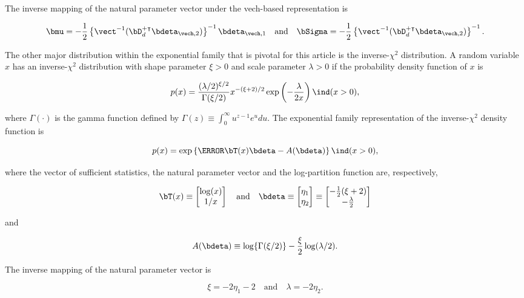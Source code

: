 \documentclass[12pt]{article}
\theoremstyle{plain}
\theoremstyle{definition}
\theoremstyle{remark}
\begin{document}
\noindent The inverse mapping of the natural parameter vector under the vech-based representation is

\begin{equation}
	\bmu = -\frac12 \left\{ \vect^{-1} (\bD_d^{+ \intercal}\bdeta_{\vech, 2}) \right\}^{-1} \bdeta_{\vech, 1} \quad
	\text{and} \quad
	\bSigma = -\frac12 \left\{ \vect^{-1} (\bD_d^{+ \intercal}\bdeta_{\vech, 2}) \right\}^{-1}.
\label{gauss_vech_comm_params}
\end{equation}

The other major distribution within the exponential family that is pivotal for this article is the inverse-$\chi^2$ distribution.
A random variable $x$ has an inverse-$\chi^2$ distribution with shape parameter $\xi > 0$ and scale parameter
$\lambda > 0$ if the probability density function of $x$ is

\[
	p(x) = 
		\frac{(\lambda/2)^{\xi/2}}{\Gamma (\xi/2)}
		x^{-(\xi + 2)/2} \exp \left( -\frac{\lambda}{2 x} \right) \ind (x > 0),
\]

\noindent where $\Gamma (\cdot)$ is the gamma function defined by $\Gamma (z) \equiv \int_0^\infty u^{z - 1} e^u
du$. The exponential family representation of the inverse-$\chi^2$ density function is

\[
	p(x) = \exp \left\{ \T{\bT (x)} \bdeta - A(\bdeta) \right\} \ind (x > 0),
\]

\noindent where the vector of sufficient statistics, the natural parameter vector and the log-partition function are,
respectively,

\[
	\bT (x) \equiv \begin{bmatrix}
		\log (x) \\
		1/x
	\end{bmatrix} \quad
	\text{and} \quad
	\bdeta \equiv \begin{bmatrix}
		\eta_1 \\
		\eta_2
	\end{bmatrix} \equiv \begin{bmatrix}
		-\frac12 (\xi + 2) \\
		-\frac{\lambda}{2}
	\end{bmatrix}
\]

\noindent and

\[
	A(\bdeta) \equiv \log \{ \Gamma (\xi/2) \} - \frac{\xi}{2} \log (\lambda/2).
\]

\noindent The inverse mapping of the natural parameter vector is \cite[equation~8]{maestrini20}

\[
	\xi = -2 \eta_1 - 2 \quad
	\text{and} \quad
	\lambda = -2 \eta_2.
\]
\end{document}
